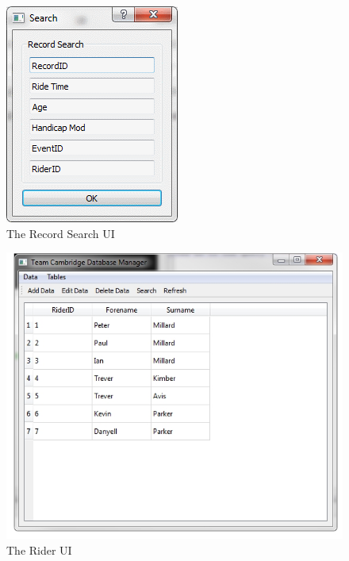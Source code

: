 \begin{figure}
\includegraphics[width=\textwidth]{./Maintenance/UI/RecordSearch.png}
\caption{The Record Search UI} \label{fig:RecordSearch_UI}
\end{figure}

\begin{figure}
\includegraphics[width=\textwidth]{./Maintenance/UI/Rider.png}
\caption{The Rider UI} \label{fig:Rider_UI}
\end{figure}

